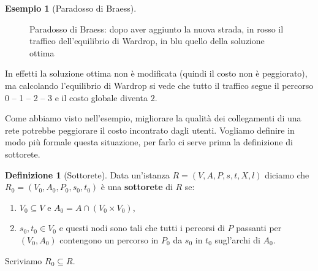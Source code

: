 \documentclass[a4paper]{article}
\theoremstyle{plain}
\theoremstyle{definition}
\newtheorem{mydef}[myteo]{Definizione}
\newtheorem{myes}[myteo]{Esempio}
\theoremstyle{remark}
\newcommand{\pa}[1]{\left(#1\right)}
\begin{document}
\begin{myes}[Paradosso di Braess{\cite[pag. 263]{braess1968}}]
  \begin{figure}[ht]
    \centering

    \caption{Paradosso di Braess: dopo aver aggiunto la nuova strada,
      in rosso il traffico dell'equilibrio di Wardrop, in blu quello
      della soluzione ottima}
    \label{fig:braess-dopo}
  \end{figure}

  In effetti la soluzione ottima non è modificata (quindi il costo non
  è peggiorato), ma calcolando l'equilibrio di Wardrop si vede che
  tutto il traffico segue il percorso 0 -- 1 -- 2 -- 3 e il costo
  globale diventa $2$.
\end{myes}

Come abbiamo visto nell'esempio, migliorare la qualità dei
collegamenti di una rete potrebbe peggiorare il costo incontrato dagli
utenti. Vogliamo definire in modo più formale questa situazione, per
farlo ci serve prima la definizione di sottorete.

\begin{mydef}[Sottorete]
\label{def:sottorete}
  Data un'istanza $R=(V,A,P,s,t,X,l)$ diciamo che
  $R_0=(V_0,A_0,P_0,s_0,t_0)$ è una \textbf{sottorete} di $R$ se:
  \begin{enumerate}
  \item $V_0 \subseteq V$ e $A_0 = A \cap \pa{V_0\times V_0}$,
  \item $s_0,t_0\in V_0$ e questi nodi sono tali che tutti i percorsi
    di $P$ passanti per $\pa{V_0,A_0}$ contengono un percorso in $P_0$
    da $s_0$ in $t_0$ sugl'archi di $A_0$.
  \end{enumerate}
  Scriviamo $R_0\subseteq R$.
\end{mydef}
\end{document}
